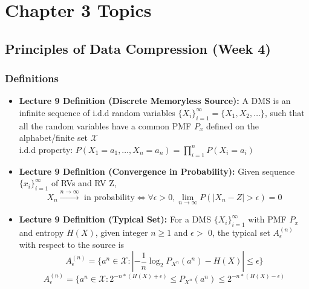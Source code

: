 \documentclass{article}
\begin{document}
\section{Chapter 3 Topics}
\subsection{Principles of Data Compression (Week 4)}
\subsubsection{Definitions}
\begin{itemize}
    \item \textbf{Lecture 9 Definition (Discrete Memoryless Source):}
    A DMS is an infinite sequence of i.d.d random variables \(\{X_{i}\}^\infty_{i=1} = \{X_1, X_2, \ldots\}\), such that all the random variables have a common PMF \(P_x\) defined on the alphabet/finite set \(\mathcal{X}\)
\\ i.d.d property: \(P(X_1 = a_1, \ldots, X_n = a_n) = \prod_{i=1}^n P(X_i=a_i)\)
    \item \textbf{Lecture 9 Definition (Convergence in Probability):} Given sequence \(\{x_i\}^\infty_{i=1}\) of RVs and RV Z,
    \[X_n \xrightarrow[]{n\to\infty} \text{ in probability} \Longleftrightarrow \forall \epsilon > 0, \lim_{n\to\infty} P(|X_n-Z|>\epsilon)=0\]    
    
    \item \textbf{Lecture 9 Definition (Typical Set):} For a DMS \(\{X_i\}^\infty_{i=1}\) with PMF \(P_x\) and entropy \(H(X)\), given integer \(n \geq 1\)
    and \(\epsilon >\) 0, the typical set \(A_\epsilon^{(n)}\) with respect to the source is
    \[A^{(n)}_\epsilon = \{a^n \in \mathcal{X}: \left |-\frac{1}{n} \log_2 P_{X^n}(a^n) - H(X) \right|\leq\epsilon\}\]
    \[A^{(n)}_\epsilon = \{a^n \in \mathcal{X}: 2^{-n*(H(X) + \epsilon)} \leq P_{X^n}(a^n) \leq 2^{-n*(H(X) - \epsilon)}\]



\end{itemize}
\end{document}
